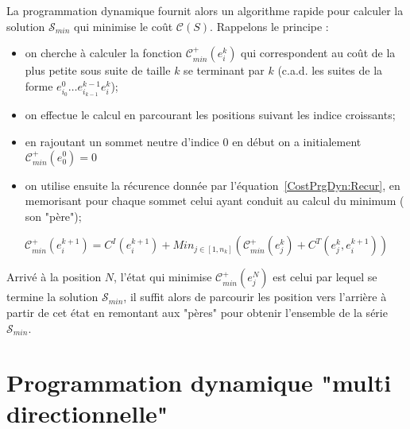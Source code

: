 La programmation dynamique fournit alors un algorithme rapide pour
calculer la solution $\mathcal S_{min} $ qui minimise le 
co\^ut $ \mathcal C (S) $.
Rappelons le principe :

\begin{itemize}

\label{Def:CPlusMin}
   \item on cherche \`a calculer la fonction $ \mathcal C^+_{min} (e^k_i)$
   qui correspondent au co\^ut de la plus petite sous suite de
   taille $k$ se  terminant par $k$ (c.a.d.  les suites 
   de la forme $e^0_{i_0} \dots e^{k-1}_{i_{k-1}} e^k_i$);
   
   \item on effectue le calcul en parcourant les positions 
         suivant les indice croissants;

   \item  en rajoutant un sommet neutre d'indice $0$ en d\'ebut on a
          initialement  $ \mathcal C^+_{min} (e^0_0) = 0$

   \item on utilise ensuite la r\'ecurence donn\'ee par
         l'\'equation~\ref{CostPrgDyn:Recur}, en memorisant
	 pour chaque sommet celui ayant conduit au calcul
	 du minimum ( son "p\`ere");
         
\end{itemize}

\begin{equation}
\label{CostPrgDyn:Recur}
 \mathcal C^+_{min} (e^{k+1}_i) =  C^I(e^{k+1}_i)+Min_{j\in[1,n_k]}(
             \mathcal  C^+_{min} (e^k_j) +  C^T(e^k_j,e^{k+1}_i)
 )
\end{equation}

Arriv\'e  \`a la position $N$, l'\'etat qui minimise $\mathcal  C^+_{min} (e^N_j) $
est celui par lequel se termine  la solution $\mathcal S_{min} $, il
suffit alors de parcourir les position vers l'arri\`ere \`a partir de cet
\'etat en remontant aux "p\`eres" pour obtenir l'ensemble de  la
s\'erie $\mathcal S_{min} $.



\section{Programmation dynamique "multi directionnelle"}

